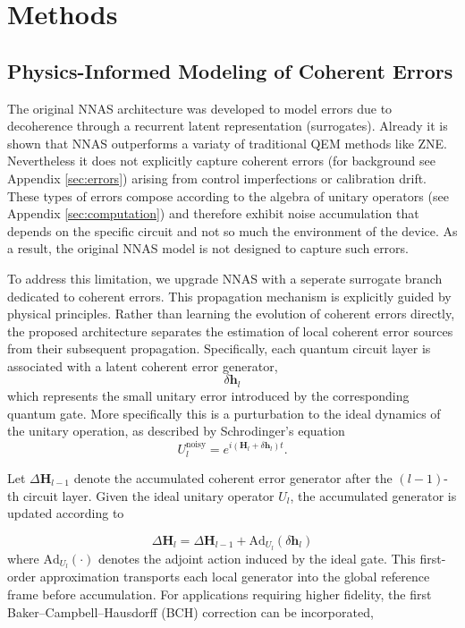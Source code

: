 \section{Methods}

\subsection{Physics-Informed Modeling of Coherent Errors}

The original NNAS architecture was developed to model errors due to decoherence through a recurrent latent representation (surrogates). Already it is shown \cite{xu2025} that NNAS outperforms a variaty of traditional QEM methods like ZNE. Nevertheless it does not explicitly capture coherent errors (for background see Appendix \ref{sec:errors}) arising from control imperfections or calibration drift.
These types of errors compose according to the algebra of unitary operators (see Appendix \ref{sec:computation}) and therefore exhibit noise accumulation that depends on the specific circuit and not so much the environment of the device. As a result, the original NNAS model is not designed to capture such errors.

To address this limitation, we upgrade NNAS with a seperate surrogate branch dedicated to coherent errors. This propagation mechanism is explicitly guided by physical principles. Rather than learning the evolution of coherent errors directly, the proposed architecture separates the estimation of local coherent error sources from their subsequent propagation. Specifically, each quantum circuit layer is associated with a latent coherent error generator,
\begin{equation}
    \label{eq:error_generator}
    \delta\mathbf{h}_l
\end{equation}
which represents the small unitary error introduced by the corresponding quantum gate. More specifically this is a purturbation to the ideal dynamics of the unitary operation, as described by Schrodinger's equation
\begin{equation}
    U_l^\text{noisy} = e^{i(\mathbf{H}_l + \delta\mathbf{h}_l)t}.
\end{equation}

Let $\Delta\mathbf{H}_{l-1}$ denote the accumulated coherent error generator after the $(l-1)$-th circuit layer. Given the ideal unitary operator $U_l$, the accumulated generator is updated according to

\begin{equation}
\Delta\mathbf{H}_l = \Delta\mathbf{H}_{l-1} + \mathrm{Ad}_{U_l}(\delta\mathbf{h}_l)
\end{equation}
where $\mathrm{Ad}_{U_l}(\cdot)$ denotes the adjoint action induced by the ideal gate. This first-order approximation transports each local generator into the global reference frame before accumulation. For applications requiring higher fidelity, the first Baker--Campbell--Hausdorff (BCH) correction can be incorporated,

